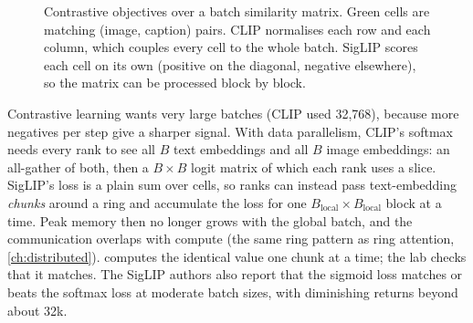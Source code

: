 \begin{figure}[t]
\centering
{}
\caption{Contrastive objectives over a batch similarity matrix. Green cells are matching
(image, caption) pairs. CLIP normalises each row and each column, which couples every cell to the
whole batch. SigLIP scores each cell on its own (positive on the diagonal, negative elsewhere),
so the matrix can be processed block by block.}
\label{fig:align:clip}
\end{figure}

\begin{systemslens}
Contrastive learning wants very large batches (CLIP used 32{,}768), because more negatives per
step give a sharper signal. With data parallelism, CLIP's softmax needs every rank to see all
$B$ text embeddings and all $B$ image embeddings: an all-gather of both, then a $B\times B$ logit matrix
of which each rank uses a slice. SigLIP's loss is a plain sum over cells, so ranks can instead
pass text-embedding \emph{chunks} around a ring and accumulate the loss for one $B_{\text{local}}\times
B_{\text{local}}$ block at a time. Peak memory then no longer grows with the global batch, and the
communication overlaps with compute (the same ring pattern as ring attention, \cref{ch:distributed}).
 computes the identical value one chunk at a time; the
lab checks that it matches. The SigLIP authors also report that the sigmoid loss matches or beats
the softmax loss at moderate batch sizes, with diminishing returns beyond about 32k.
\end{systemslens}

